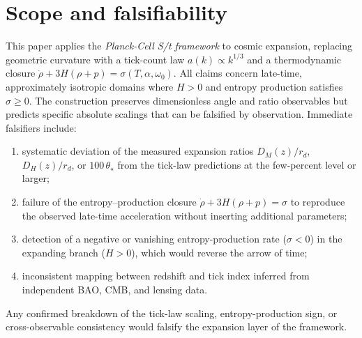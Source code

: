 \section*{Scope and falsifiability}
This paper applies the \emph{Planck-Cell S/t framework} to cosmic
expansion, replacing geometric curvature with a tick-count law
\(a(k)\propto k^{1/3}\) and a thermodynamic closure
\(\dot{\rho}+3H(\rho+p)=\sigma(T,\alpha,\omega_{0})\).
All claims concern late-time, approximately isotropic domains where
\(H>0\) and entropy production satisfies \(\sigma\ge0\).
The construction preserves dimensionless angle and ratio observables but
predicts specific absolute scalings that can be falsified by observation.
Immediate falsifiers include:
\begin{enumerate}[label=(\roman*)]
  \item systematic deviation of the measured expansion ratios
        \(D_{M}(z)/r_{d}\), \(D_{H}(z)/r_{d}\), or
        \(100\,\theta_{\star}\) from the tick-law predictions
        at the few-percent level or larger;
  \item failure of the entropy–production closure
        \(\dot{\rho}+3H(\rho+p)=\sigma\) to reproduce the
        observed late-time acceleration without inserting
        additional parameters;
  \item detection of a negative or vanishing entropy-production rate
        (\(\sigma<0\)) in the expanding branch (\(H>0\)),
        which would reverse the arrow of time;
  \item inconsistent mapping between redshift and tick index
        inferred from independent BAO, CMB, and lensing data.
\end{enumerate}
Any confirmed breakdown of the tick-law scaling,
entropy-production sign, or cross-observable consistency would falsify
the expansion layer of the framework.
